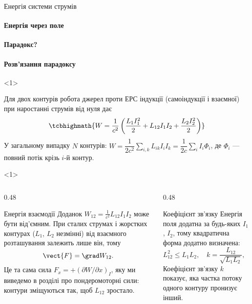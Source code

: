 \documentclass[onlytextwidth]{beamer}
\begin{document}
\begin{frame}{Енергія системи струмів}{}\small
	\framesubtitle<2>{Енергія через поле}
	\framesubtitle<3>{Парадокс?}
	\framesubtitle<4>{Розв'язання парадоксу}
	\begin{onlyenv}
	\begin{block}{}\justifying
		Для двох контурів робота джерел проти ЕРС індукції (самоіндукції і взаємної) при наростанні струмів від нуля дає
		\begin{equation*}
			\tcbhighmath{W = \frac{1}{c^2}\left(\frac{L_1I_1^2}{2} + L_{12}I_1I_2 + \frac{L_2I_2^2}{2}\right)}
		\end{equation*}
		У загальному випадку $N$ контурів: $W = \dfrac{1}{2c^2}\displaystyle\sum_{i,k} L_{ik}I_iI_k = \dfrac{1}{2c}\sum_i I_i\Phi_i$, де $\Phi_i$ ---
		повний потік крізь $i$-й контур.
	\end{block}
	\end{onlyenv}
	\begin{onlyenv}
	\begin{columns}[T]
		\begin{column}{0.48\linewidth}
			\begin{block}{Енергія взаємодії}\justifying
				Доданок $W_{12} = \frac{1}{c^2}L_{12}I_1I_2$ може бути від'ємним. При \alert{сталих струмах} і жорстких контурах ($L_1$, $L_2$
				незмінні) від взаємного розташування залежить лише він, тому
				\begin{equation*}
					\vect{F} = \grad W_{12}.
				\end{equation*}
				Це та сама сила $F_x = +(\partial W/\partial x)_I$, яку ми виведемо в розділі про \alert{пондеромоторні сили}: контури
				зміщуються так, щоб $L_{12}$ зростало.
			\end{block}
		\end{column}
		\begin{column}{0.48\linewidth}
			\begin{block}{Коефіцієнт зв'язку}\justifying
				Енергія поля додатна за будь-яких $I_1$, $I_2$, тому квадратична форма додатно визначена:
				\begin{equation*}
					L_{12}^2 \le L_1L_2,
					\quad
					k = \frac{L_{12}}{\sqrt{L_1L_2}},\quad |k| \le 1.
				\end{equation*}
				Коефіцієнт зв'язку $k$ показує, яка частка потоку одного контуру пронизує інший.
			\end{block}
		\end{column}
	\end{columns}

\end{onlyenv}
\end{frame}
\end{document}
